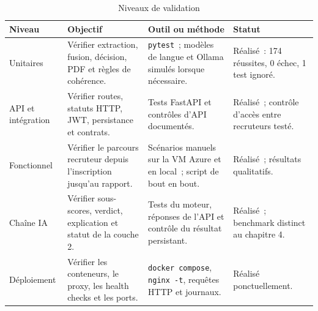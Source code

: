 \begin{table}[H]
\centering
\small
\caption{Niveaux de validation}
\label{tab:chap6-validation-strategy}
\begin{tabularx}{\textwidth}{|p{}|p{}|X|p{}|}
\hline
\textbf{Niveau} & \textbf{Objectif} & \textbf{Outil ou méthode} & \textbf{Statut}\\
\hline
Unitaires & Vérifier extraction, fusion, décision, PDF et règles de cohérence. & \texttt{pytest}~; modèles de langue et Ollama simulés lorsque nécessaire. & Réalisé~: 174 réussites, 0 échec, 1 test ignoré.\\
\hline
API et intégration & Vérifier routes, statuts HTTP, JWT, persistance et contrats. & Tests FastAPI et contrôles d'API documentés. & Réalisé~; contrôle d'accès entre recruteurs testé.\\
\hline
Fonctionnel & Vérifier le parcours recruteur depuis l'inscription jusqu'au rapport. & Scénarios manuels sur la VM Azure et en local~; script de bout en bout. & Réalisé~; résultats qualitatifs.\\
\hline
Chaîne IA & Vérifier sous-scores, verdict, explication et statut de la couche 2. & Tests du moteur, réponses de l'API et contrôle du résultat persistant. & Réalisé~; benchmark distinct au chapitre 4.\\
\hline
Déploiement & Vérifier les conteneurs, le proxy, les health checks et les ports. & \texttt{docker compose}, \texttt{nginx -t}, requêtes HTTP et journaux. & Réalisé ponctuellement.\\
\hline
\end{tabularx}
\end{table}


